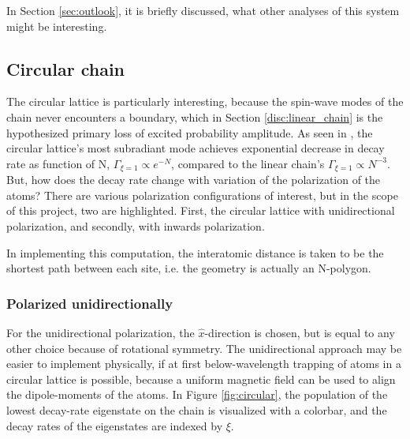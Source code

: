 \documentclass{article}
\begin{document}
In Section \ref{sec:outlook}, it is briefly discussed, what other analyses of this system might be interesting. 

\subsection{Circular chain}\label{disc:circular}

\noindent
The circular lattice is particularly interesting, because the spin-wave modes of the chain never encounters a boundary, which in Section \ref{disc:linear_chain} is the hypothesized primary loss of excited probability amplitude. As seen in \cite[Section III.B.4]{Asenjo}, the circular lattice's most subradiant mode achieves exponential decrease in decay rate as function of N, $\Gamma_{\xi = 1} \propto e^{-N}$, compared to the linear chain's $\Gamma_{\xi=1} \propto N^{-3}$. But, how does the decay rate change with variation of the polarization of the atoms? There are various polarization configurations of interest, but in the scope of this project, two are highlighted. First, the circular lattice with unidirectional polarization, and secondly, with inwards polarization. 

In implementing this computation, the interatomic distance is taken to be the shortest path between each site, i.e. the geometry is actually an N-polygon. 

\subsubsection{Polarized unidirectionally}

\noindent
For the unidirectional polarization, the $\hat{x}$-direction is chosen, but is equal to any other choice because of rotational symmetry. The unidirectional approach may be easier to implement physically, if at first below-wavelength trapping of atoms in a circular lattice is possible, because a uniform magnetic field can be used to align the dipole-moments of the atoms. In Figure \ref{fig:circular}, the population of the lowest decay-rate eigenstate on the chain is visualized with a colorbar, and the decay rates of the eigenstates are indexed by $\xi$. 
\end{document}
